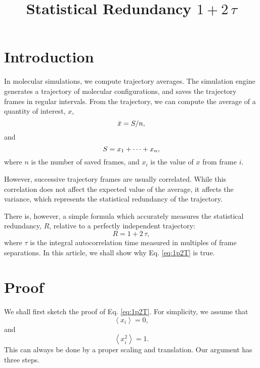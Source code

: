 \documentclass[12pt]{article}
\begin{document}
\title{Statistical Redundancy $1 + 2 \, \tau$}
\author{}
\date{\vspace{-10ex}}
\maketitle


\section{Introduction}


In molecular simulations, we compute trajectory averages.
%
The simulation engine
generates a trajectory of molecular configurations,
and saves the trajectory frames in regular intervals.
%
From the trajectory,
we can compute the average of a quantity of interest, $x$,
%
\begin{equation}
  \bar x = S / n,
  \notag
\end{equation}
%
and
%
\begin{equation}
  S = x_1 + \cdots + x_n,
  \notag
\end{equation}
%
where $n$ is the number of saved frames,
and $x_i$ is the value of $x$ from frame $i$.

However, successive trajectory frames are usually correlated.
%
While this correlation does not affect the expected value
of the average, it affects the variance, which represents
the statistical redundancy of the trajectory.

There is, however, a simple formula
which accurately measures the statistical redundancy, $R$,
relative to a perfectly independent trajectory:
%
\begin{equation}
  R = 1 + 2 \, \tau,
  \label{eq:1p2T}
\end{equation}
%
where $\tau$ is the integral autocorrelation time measured
in multiples of frame separations.
%
In this article, we shall show why Eq. \eqref{eq:1p2T} is true.


\section{Proof}


We shall first sketch the proof of Eq. \eqref{eq:1p2T}.
%
For simplicity, we assume that
%
\begin{equation}
  \left\langle x_i \right\rangle = 0,
  \label{eq:ave_xi}
\end{equation}
%
and
%
\begin{equation}
  \left\langle x_i^2 \right\rangle = 1.
  \label{eq:var_xi}
\end{equation}
%
This can always be done by a proper scaling and translation.
%
Our argument has three steps.
\end{document}
